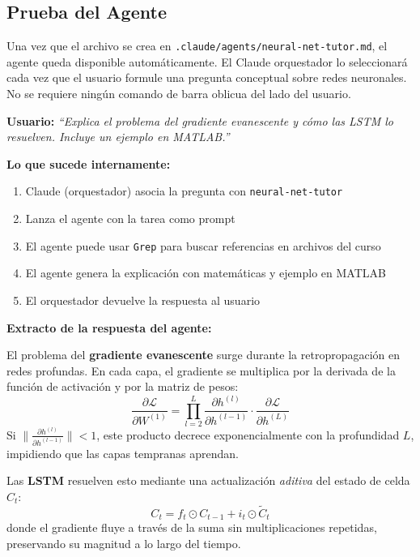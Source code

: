 \documentclass[11pt,letterpaper]{article}
\begin{document}
\subsection{Prueba del Agente}

Una vez que el archivo se crea en \texttt{.claude/agents/neural-net-tutor.md}, el agente queda disponible automáticamente. El Claude orquestador lo seleccionará cada vez que el usuario formule una pregunta conceptual sobre redes neuronales. No se requiere ningún comando de barra oblicua del lado del usuario.

\begin{examplebox}[title=Interacciones de Prueba]

\textbf{Usuario:} \textit{``Explica el problema del gradiente evanescente y cómo las LSTM lo resuelven. Incluye un ejemplo en MATLAB.''}

\textbf{Lo que sucede internamente:}
\begin{enumerate}
    \item Claude (orquestador) asocia la pregunta con \texttt{neural-net-tutor}
    \item Lanza el agente con la tarea como prompt
    \item El agente puede usar \texttt{Grep} para buscar referencias en archivos del curso
    \item El agente genera la explicación con matemáticas y ejemplo en MATLAB
    \item El orquestador devuelve la respuesta al usuario
\end{enumerate}

\textbf{Extracto de la respuesta del agente:}

El problema del \textbf{gradiente evanescente} surge durante la retropropagación en redes profundas. En cada capa, el gradiente se multiplica por la derivada de la función de activación y por la matriz de pesos:
$$\frac{\partial \mathcal{L}}{\partial W^{(1)}} = \prod_{l=2}^{L} \frac{\partial h^{(l)}}{\partial h^{(l-1)}} \cdot \frac{\partial \mathcal{L}}{\partial h^{(L)}}$$
Si $\|\frac{\partial h^{(l)}}{\partial h^{(l-1)}}\| < 1$, este producto decrece exponencialmente con la profundidad $L$, impidiendo que las capas tempranas aprendan.

Las \textbf{LSTM} resuelven esto mediante una actualización \emph{aditiva} del estado de celda $C_t$:
$$C_t = f_t \odot C_{t-1} + i_t \odot \tilde{C}_t$$
donde el gradiente fluye a través de la suma sin multiplicaciones repetidas, preservando su magnitud a lo largo del tiempo.
\end{examplebox}
\end{document}
